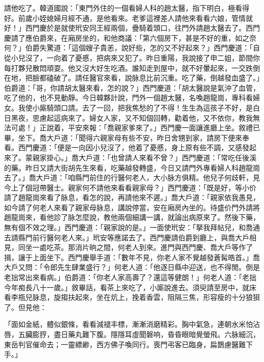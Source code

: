請他吃了。韓道國說：「東門外住的一個看婦人科的趙太醫，指下明白，極看得好。前歲小姪媳婦月經不通，是他看來。老爹這裡差人請他來看看六娘，管情就好！」西門慶於是就使玳安同王經兩個，疊騎着頭口，往門外請趙太醫去了。西門慶請了應伯爵來，在廂房坐的，和他商議：「第六個房下，甚是不好的重，如之奈何？」伯爵失驚道：「這個嫂子貴恙，說好些，怎的又不好起來？」西門慶道：「自從小兒沒了，一向着了憂慼，把病來又犯了。昨日重陽，我說接了申二姐，節間你每打夥兒散悶頑耍。他又沒大好生吃酒。誰知走到屋中，就不好暈起來，一交跌倒在地，把臉都磕破了。請任醫官來看，說脉息比前沉重。吃了藥，倒越發血盛了。」伯爵道：「哥，你請胡太醫來看，怎的說？」西門慶道：「胡太醫說是氣沖了血管，吃了他的，也不見動靜。今日韓夥計說，門外一個趙太醫，名喚趙龍崗，專科看婦女。我使小廝騎頭口請。去了一回，把我焦愁的了不得！生生為這孩子不好，是白日黑夜，思慮起這病來了。婦女人家，又不知個回轉，勸着他，又不依你，教我無法可處！」正說着，平安來報：「喬親家爹來了。」西門慶一面讓進廳上坐。敘禮已畢，坐下。喬大戶道：「聞得六親家母有些不安，昨日舍甥到家，請房下便來奉看。西門慶道：「便是一向因小兒沒了，他着了憂慼，身上原有些不調，又感發起來了。蒙親家掛心。」喬大戶道：「也曾請人來看不曾？」西門慶道：「常吃任後溪的藥。昨日又請大街胡先生來看，吃藥越發轉盛，今日又請門外專看婦人科趙龍崗去了。」喬大戶道：「咱縣門前住的行醫何老人，大小脉方俱精。他兒子何歧軒，見今上了個冠帶醫士。親家何不請他來看看親家母？」西門慶道：「既是好，等小价請了趙龍崗來看了脉息，看怎的說，再請他來不遲。」喬大戶道：「親家依我愚見，如今請了何老人來看了親家母脉息，講說停當，安在廂房內坐的。待盛价門外請將趙龍崗來，看他診了脉怎麼說，教他兩個細講一講，就論出病原來了。然後下藥，無有個不效之理。」西門慶道：「親家說的是。」一面使玳安：「拏我拜帖兒，和喬通去請縣門前行醫何老人來。」玳安等應諾去了。西門慶請伯爵到廳上，與喬大戶相見，同坐一處吃茶。那消片晌之間，何老人到來。進門與西門慶、喬大戶等作了揖，讓于上面坐下。西門慶舉手道：「數年不見，你老人家不覺越發蒼髯皓首。」喬大戶又問：「令郎先生肆業盛行？」何老人道：「他逐日縣中迎送，也不得閒。倒是老拙常出來看病。」伯爵道：「你老人家高壽了？還這等健朗！」何老人道：「老拙今年痴長八十一歲。」敘畢話，看茶上來吃了，小廝說進去。須臾請至房中，就床看李瓶兒脉息，旋搊扶起來，坐在炕上，挽着香雲，阻隔三焦，形容瘦的十分狼狽了。但見他：

「面如金紙，體似銀條，看看減褪丰標，漸漸消磨精彩。胸中氣急，連朝水米怕沾唇，五臟膨脝，盡日藥丸難下腹。隱隱耳虛聞磐响，昏昏眼暗覺螢飛。六脉細沉，東岳判官催命去；一靈縹緲，西方佛子喚同行。喪門弔客已臨身，扁鵲慮醫難下手。」

